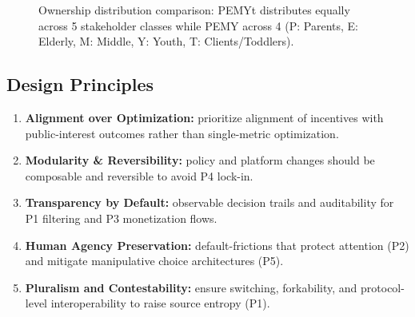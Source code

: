 \documentclass[11pt,a4paper]{article}
\theoremstyle{definition}
\theoremstyle{remark}
\begin{document}
\begin{figure}[H]
\centering
{}
\caption{Ownership distribution comparison: PEMYt distributes equally across 5 stakeholder classes while PEMY across 4 (P: Parents, E: Elderly, M: Middle, Y: Youth, T: Clients/Toddlers).}
\label{fig:pemyt_pemy_ownership}
\end{figure}

\subsection{Design Principles}
\label{app:pemy_principles}

\begin{enumerate}
  \item \textbf{Alignment over Optimization:} prioritize alignment of incentives with public-interest outcomes rather than single-metric optimization.
  \item \textbf{Modularity \& Reversibility:} policy and platform changes should be composable and reversible to avoid P4 lock-in.
  \item \textbf{Transparency by Default:} observable decision trails and auditability for P1 filtering and P3 monetization flows.
  \item \textbf{Human Agency Preservation:} default-frictions that protect attention (P2) and mitigate manipulative choice architectures (P5).
  \item \textbf{Pluralism and Contestability:} ensure switching, forkability, and protocol-level interoperability to raise source entropy (P1).
\end{enumerate}
\end{document}
